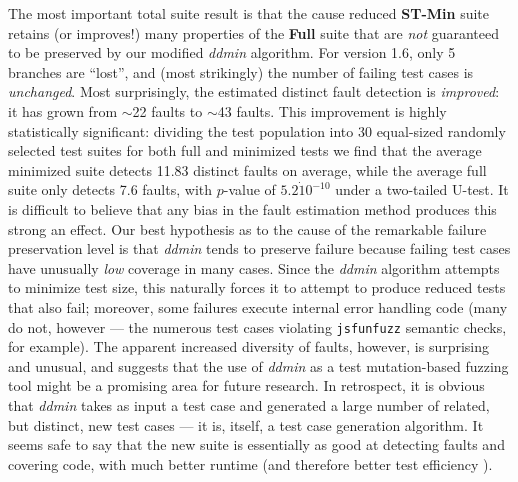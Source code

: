 The most important total suite result is that the cause reduced {\bf
ST-Min} suite retains (or improves!) many properties of the {\bf Full}
suite that are \emph{not} guaranteed to be preserved by our modified
\emph{ddmin} algorithm.  For version 1.6, only 5 branches are
``lost'', and (most strikingly) the number of failing test cases is
\emph{unchanged}.  Most surprisingly, the estimated distinct fault
detection is \emph{improved}: it has grown from $\sim$22 faults to
$\sim$43 faults.  This improvement is highly statistically
significant: dividing the test population into 30 equal-sized randomly
selected test suites for both full and minimized tests we find that
the average minimized suite detects 11.83 distinct faults on average,
while the average full suite only detects 7.6 faults, with $p$-value
of $5.2 \dot 10^{-10}$ under a two-tailed U-test.  It is difficult to
believe that any bias in the fault estimation method produces this
strong an effect.  Our best hypothesis as to the cause of the
remarkable failure preservation level is that \emph{ddmin} tends to
preserve failure because failing test cases have unusually \emph{low}
coverage in many cases.  Since the \emph{ddmin} algorithm attempts to
minimize test size, this naturally forces it to attempt to produce
reduced tests that also fail; moreover, some failures execute internal
error handling code (many do not, however --- the numerous test cases
violating \texttt{jsfunfuzz} semantic checks, for example).  The
apparent increased diversity of faults, however, is surprising and
unusual, and suggests that the use of \emph{ddmin} as a test
mutation-based fuzzing tool might be a promising area for future
research.  In retrospect, it is obvious that \emph{ddmin} takes as
input a test case and generated a large number of related, but
distinct, new test cases --- it is, itself, a test case generation
algorithm.  It seems safe to say that the new suite is essentially as
good at detecting faults and covering code, with much better runtime
(and therefore better test efficiency \cite{gupta-jalote-sttt06}).

